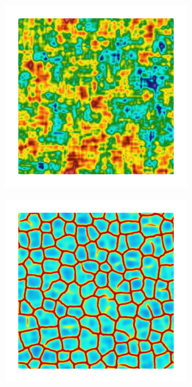\begin{figure}[!htb]
\begin{subfigure}[b]{0.15\textwidth}
    \caption{}
    \label{fig: Chapter4/2D/Gc_exp_cartesian_5_5_rho_0_seed_d}
  \end{subfigure}
  \begin{subfigure}[b]{0.15\textwidth}
    \includegraphics[width=\textwidth]{Chapter4/figures/2D/psic_exp_cartesian_5_5_rho_0_seed_d.png}
    \caption{}
    \label{fig: Chapter4/2D/psic_exp_cartesian_5_5_rho_0_seed_d}
  \end{subfigure}
  \begin{subfigure}[b]{0.15\textwidth}
    \includegraphics[width=\textwidth]{Chapter4/figures/2D/d_exp_cartesian_5_5_rho_0_seed_d.png}
    \caption{}
    \label{fig: Chapter4/2D/d_exp_cartesian_5_5_rho_0_seed_d}
  \end{subfigure}
  

\end{figure}
